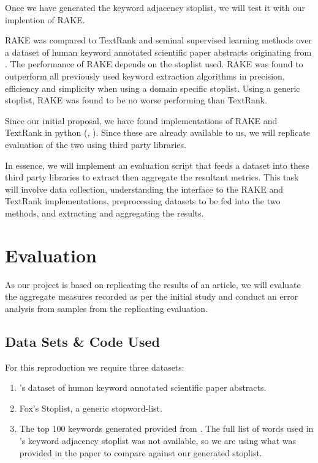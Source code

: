 \documentclass[11pt,a4paper]{article}
\begin{document}
Once we have generated the keyword adjacency stoplist, we will test it with our implention of RAKE.

RAKE was compared to TextRank and seminal supervised learning methods \citep{hulth-2003-improved} over a dataset of human keyword annotated scientific paper abstracts originating from \citet{hulth-2003-improved}. The performance of RAKE depends on the stoplist used. RAKE was found to outperform all previously used keyword extraction algorithms in precision, efficiency and simplicity when using a domain specific stoplist. Using a generic stoplist, RAKE was found to be no worse performing than TextRank.

Since our initial proposal, we have found implementations of RAKE and TextRank in python (\citet{2}, \citet{3}). Since these are already available to us, we will replicate  evaluation of the two using third party libraries. 

In essence, we will implement an evaluation script that feeds a dataset into these third party libraries to extract then aggregate the resultant metrics. This task will involve data collection, understanding the interface to the RAKE and TextRank implementations, preprocessing datasets to be fed into the two methods, and extracting and aggregating the results.

\section{Evaluation}

As our project is based on replicating the results of an article, we will evaluate the aggregate measures recorded as per the initial study and conduct an error analysis from samples from the replicating evaluation. 



\subsection{Data Sets \& Code Used}
For this reproduction we require three datasets:

\begin{enumerate}
\item \citet{hulth-2003-improved}'s dataset of human keyword annotated scientific paper abstracts.
\item Fox's Stoplist, a generic stopword-list.
\item The top 100 keywords generated provided from . The full list of words used in 's keyword adjacency stoplist was not available, so we are using what was provided in the paper to compare against our generated stoplist. 
\end{enumerate}  
\end{document}
